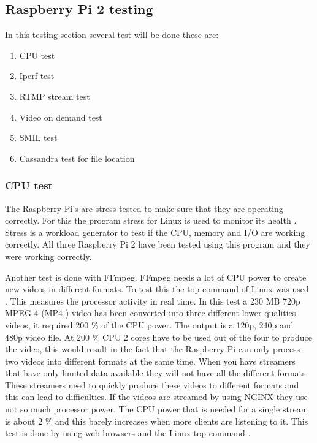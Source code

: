 \documentclass{sig-alternate-br}
\begin{document}
\subsection{Raspberry Pi 2  testing}

In this testing section several test will be done these are: 
\begin{enumerate}[topsep=0pt,itemsep=-1ex,partopsep=1ex,parsep=1ex] 
	\item CPU test
	\item Iperf test
	\item RTMP stream test
	\item Video on demand test
	\item SMIL test
	\item Cassandra test for file location
\end{enumerate}

\subsubsection{CPU test}

The Raspberry Pi's are stress tested to make sure that they are operating correctly. For this the program stress for Linux is used to monitor its health \cite{stress}. Stress is a workload generator to test if the CPU, memory and I/O are working correctly. All three Raspberry Pi 2 have been tested using this program and they were working correctly. 

Another test is done with FFmpeg. FFmpeg needs a lot of CPU power to create new videos in different formats. To test this the top command of Linux was used \cite{top}. This measures the processor activity in real time. In this test a 230 MB 720p MPEG-4 (MP4 ) video has been converted into three different lower qualities videos, it required 200 \% of the CPU power. The output is a 120p, 240p and 480p video file. At 200 \% CPU 2 cores have to be used out of the four to produce the video, this would result in the fact that the Raspberry Pi can only process two videos into different formats at the same time. When you have streamers that have only limited data available they will not have all the different formats. These streamers need to quickly produce these videos to different formats and this can lead to difficulties.  \newline
If the videos are streamed by using NGINX they use not so much processor power. The CPU power that is needed for a single stream is about 2 \% and this barely increases when more clients are listening to it. This test is done by using web browsers and the Linux top command \cite{top}. 
\end{document}

